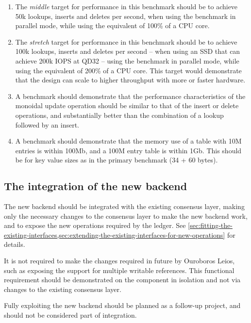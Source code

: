 \documentclass[11pt,a4paper]{article}
\begin{document}
\begin{enumerate}
\item The \emph{middle} target for performance in this benchmark should be
      to achieve 50k lookups, inserts and deletes per second, when using the
      benchmark in parallel mode, while using the equivalent of 100\% of a
      CPU core.

\item The \emph{stretch} target for performance in this benchmark should be
      to achieve 100k lookups, inserts and deletes per second -- when using an
      SSD that can achieve 200k IOPS at QD32 -- using the benchmark in parallel
      mode, while using the equivalent of 200\% of a CPU core. This target
      would demonstrate that the design can scale to higher throughput with
      more or faster hardware.

\item A benchmark should demonstrate that the performance characteristics
      of the monoidal update operation should be similar to that of the insert
      or delete operations, and substantially better than the combination of a
      lookup followed by an insert.

\item A benchmark should demonstrate that the memory use of a table with 10M
      entries is within 100Mb, and a 100M entry table is within 1Gb. This
      should be for key value sizes as in the primary benchmark (34 + 60 bytes).

\end{enumerate}

\subsection{The integration of the new backend}

The new backend should be integrated with the existing consensus layer, making
only the necessary changes to the consensus layer to make the new backend work,
and to expose the new operations required by the ledger.
See \cref{sec:fitting-the-existing-interfaces,sec:extending-the-existing-interfaces-for-new-operations} for details.

It is not required to make the changes required in future by Ouroboros Leios,
such as exposing the support for multiple writable references. This functional
requirement should be demonstrated on the component in isolation and not via
changes to the existing consensus layer.

Fully exploiting the new backend should be planned as a follow-up project, and
should not be considered part of integration.



\end{document}
